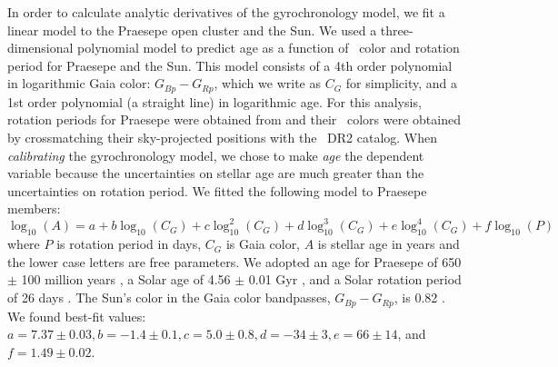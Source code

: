 In order to calculate analytic derivatives of the gyrochronology model, we
fit a linear model to the Praesepe open cluster and the Sun.
We used a three-dimensional polynomial model to predict age as a
function of \gaia\ color and rotation period for Praesepe and the Sun.
This model consists of a 4th order polynomial in logarithmic Gaia color:
$G_{Bp} - G_{Rp}$, which we write as $C_G$ for simplicity, and a 1st order
polynomial (a straight line) in logarithmic age.
For this analysis, rotation periods for Praesepe were obtained from
\citet{rebull2017} and their \gaia\ colors were obtained by crossmatching
their sky-projected positions with the \gaia\ DR2 catalog.
When {\it calibrating} the gyrochronology model, we chose to make {\it age}
the dependent variable because the uncertainties on stellar age are much
greater than the uncertainties on rotation period.
We fitted the following model to Praesepe members:
\begin{equation}
    \log_{10}(A) = a + b\log_{10}(C_G) + c\log_{10}^2(C_G) +
    d\log_{10}^3(C_G) + e\log_{10}^4(C_G) + f\log_{10}(P)
\label{eqn:gyro_age_praesepe}
\end{equation}
where $P$ is rotation period in days, $C_G$ is Gaia color, $A$ is stellar age
in years and the lower case letters are free parameters.
We adopted an age for Praesepe of 650 $\pm$ 100 million years
\citep{brandt2016, gossage2018}, a Solar age of 4.56 $\pm$ 0.01 Gyr
\citep{connelly2012}, and a Solar rotation period of 26 days \citep[][Morris
\etal, in prep]{balthasar1986, howe2000}.
The Sun's color in the Gaia color bandpasses, $G_{Bp} - G_{Rp}$, is 0.82
\citep{casagrande2018}.
We found best-fit values: $a = 7.37 \pm 0.03, b = -1.4 \pm 0.1, c = 5.0 \pm
0.8, d = -34 \pm 3, e = 66 \pm 14$, and $f = 1.49 \pm 0.02$.


